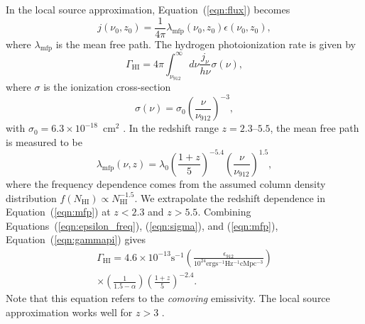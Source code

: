 \documentclass[a4paper,fleqn,usenatbib]{mnras}
\begin{document}
In the local source approximation, Equation~(\ref{eqn:flux}) becomes
\begin{equation}
  j(\nu_0, z_0) = \frac{1}{4\pi}\lambda_\mathrm{mfp}(\nu_0, z_0)\epsilon(\nu_0, z_0),
\end{equation}
where $\lambda_\mathrm{mfp}$ is the mean free path.  The hydrogen
photoionization rate is given by
\begin{equation}
  \Gamma_\mathrm{HI}=4\pi\int_{\nu_{912}}^\infty d\nu \frac{j_\nu}{h\nu} \sigma(\nu),
  \label{eqn:gammapi}
\end{equation}
where $\sigma$ is the ionization cross-section
\begin{equation}
  \sigma(\nu) = \sigma_0\left(\frac{\nu}{\nu_{912}}\right)^{-3},
  \label{eqn:sigma}
\end{equation}
with $\sigma_0=6.3\times 10^{-18}$~cm$^2$ \citep{2006agna.book.....O}.
In the redshift range $z=2.3$--$5.5$, the mean free path is measured
to be \citep{2014MNRAS.445.1745W}
\begin{equation}
  \lambda_\mathrm{mfp}(\nu, z)= \lambda_0\left(\frac{1+z}{5}\right)^{-5.4}\left(\frac{\nu}{\nu_{912}}\right)^{1.5},
  \label{eqn:mfp}
\end{equation}
where the frequency dependence comes from the assumed column density
distribution $f(N_\mathrm{HI})\propto N_\mathrm{HI}^{-1.5}$.  We
extrapolate the redshift dependence in Equation~(\ref{eqn:mfp}) at
$z<2.3$ and $z>5.5$.  Combining Equations~(\ref{eqn:epsilon_freq}),
(\ref{eqn:sigma}), and (\ref{eqn:mfp}), Equation~(\ref{eqn:gammapi})
gives
\begin{multline}
  \Gamma_\mathrm{HI}=4.6\times 10^{-13} \mathrm{s}^{-1} \left(\frac{\epsilon_{912}}{10^{24}\mathrm{erg s^{-1} Hz^{-1} cMpc^{-3}}}\right)\\
  \times\left(\frac{1}{1.5-\alpha}\right)\left(\frac{1+z}{5}\right)^{-2.4}.
\end{multline}
Note that this equation refers to the \emph{comoving} emissivity.  The
local source approximation works well for $z>3$ \citep{2013MNRAS.436.1023B}.




\end{document}
